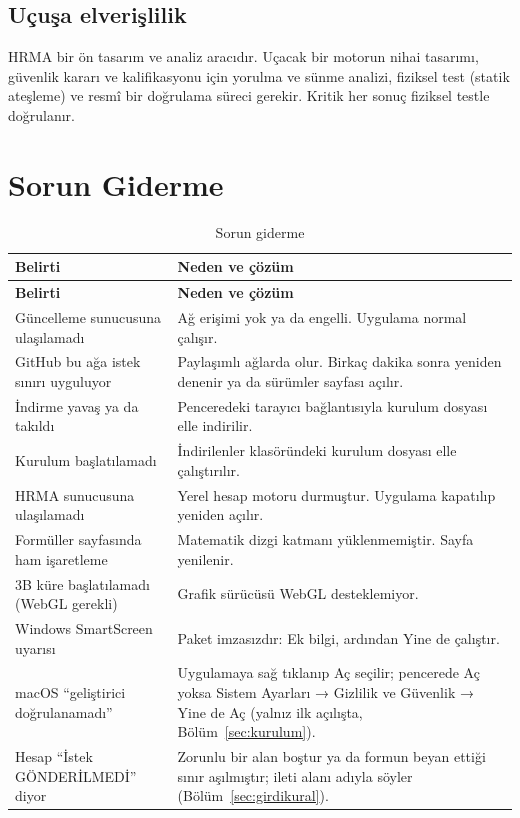 \documentclass[11pt,a4paper]{article}
\newcommand{\ui}[1]{\textsf{#1}}
\begin{document}
\subsection{Uçuşa elverişlilik}

\begin{uyarikutu}
\small\color{hrmadark}
HRMA bir ön tasarım ve analiz aracıdır. Uçacak bir motorun nihai tasarımı,
güvenlik kararı ve kalifikasyonu için yorulma ve sünme analizi, fiziksel test
(statik ateşleme) ve resmî bir doğrulama süreci gerekir. Kritik her sonuç
fiziksel testle doğrulanır.
\end{uyarikutu}

\section{Sorun Giderme}\label{sec:sorun}

\begin{longtable}{@{}>{\raggedright\arraybackslash}p{5.6cm}>{\raggedright\arraybackslash}p{10.0cm}@{}}
\caption{Sorun giderme}\label{tab:sorun}\\
\toprule
\textbf{Belirti} & \textbf{Neden ve çözüm} \\
\midrule\endfirsthead
\toprule
\textbf{Belirti} & \textbf{Neden ve çözüm} \\
\midrule\endhead
\bottomrule\endlastfoot
\ui{Güncelleme sunucusuna ulaşılamadı} & Ağ erişimi yok ya da engelli. Uygulama normal çalışır. \\
\ui{GitHub bu ağa istek sınırı uyguluyor} & Paylaşımlı ağlarda olur. Birkaç dakika sonra yeniden denenir ya da sürümler sayfası açılır. \\
İndirme yavaş ya da takıldı & Penceredeki tarayıcı bağlantısıyla kurulum dosyası elle indirilir. \\
\ui{Kurulum başlatılamadı} & İndirilenler klasöründeki kurulum dosyası elle çalıştırılır. \\
\ui{HRMA sunucusuna ulaşılamadı} & Yerel hesap motoru durmuştur. Uygulama kapatılıp yeniden açılır. \\
Formüller sayfasında ham işaretleme & Matematik dizgi katmanı yüklenmemiştir. Sayfa yenilenir. \\
\ui{3B küre başlatılamadı (WebGL gerekli)} & Grafik sürücüsü WebGL desteklemiyor. \\
Windows SmartScreen uyarısı & Paket imzasızdır: \ui{Ek bilgi}, ardından \ui{Yine de çalıştır}. \\
macOS ``geliştirici doğrulanamadı'' & Uygulamaya sağ tıklanıp \ui{Aç} seçilir; pencerede \ui{Aç} yoksa \ui{Sistem Ayarları} → \ui{Gizlilik ve Güvenlik} → \ui{Yine de Aç} (yalnız ilk açılışta, Bölüm~\ref{sec:kurulum}). \\
Hesap ``İstek GÖNDERİLMEDİ'' diyor & Zorunlu bir alan boştur ya da formun beyan ettiği sınır aşılmıştır; ileti alanı adıyla söyler (Bölüm~\ref{sec:girdikural}). \\
\end{longtable}
\end{document}
